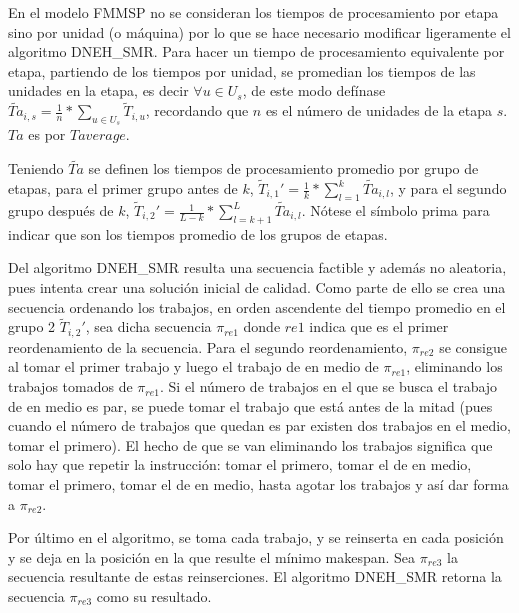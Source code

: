 \documentclass{article}
\begin{document}
\vspace{\baselineskip}
En el modelo FMMSP no
se consideran los tiempos de procesamiento por etapa sino por unidad (o máquina)
por lo que se hace necesario modificar ligeramente el algoritmo DNEH\_SMR. Para
hacer un tiempo de procesamiento equivalente por etapa, partiendo de los tiempos
por unidad, se promedian los tiempos de las unidades en la etapa, es decir
$\forall u \in U_{s}$, de este modo defínase $\widetilde{Ta}_{i,s} = \frac{1}{n}
*\sum_{u \in U_{s}} \widetilde{T}_{i,u}$, recordando que $n$ es el número de
unidades de la etapa $s$. $Ta$ es por $T average$. 

\vspace{\baselineskip}
Teniendo $\widetilde{Ta}$ se definen los tiempos de procesamiento promedio por
grupo de 
etapas, para el primer grupo antes de $k$, $\widetilde{T}_{i,1}' = \frac{1}{k}*
\sum_{l=1}^{k} \widetilde{Ta}_{i,l}$, y para el segundo grupo después de $k$,
$\widetilde{T}_{i,2}' = \frac{1}{L-k}*\sum_{l = k+1}^{L} \widetilde{Ta}_{i,l}$.
Nótese el símbolo prima para indicar que son los tiempos promedio de los grupos
de etapas. \autocite{algMNIG}

\vspace{\baselineskip}
Del algoritmo DNEH\_SMR resulta una secuencia factible y además no aleatoria,
pues intenta crear una solución inicial de calidad. Como parte de ello se crea
una secuencia ordenando los trabajos, en orden ascendente del tiempo promedio
en el grupo 2 $\widetilde{T}_{i,2}'$, sea dicha secuencia $\pi_{re1}$ donde
$re1$ indica que es el primer reordenamiento de la secuencia. Para el segundo
reordenamiento, $\pi_{re2}$ se consigue al tomar el primer trabajo y luego el
trabajo de en medio de $\pi_{re1}$, eliminando los trabajos tomados de 
$\pi_{re1}$. Si el número de trabajos en el que se busca el trabajo de en medio
es par, se puede tomar el trabajo que está antes de la mitad (pues cuando el
número de trabajos que quedan es par existen dos trabajos en el medio, tomar
el primero). El hecho de que se van eliminando los trabajos significa que solo
hay que repetir la instrucción: tomar el primero, tomar el de en medio, tomar el
primero, tomar el de en medio, hasta agotar los trabajos y así dar forma a
$\pi_{re2}$. \autocite{algMNIG}

\vspace{\baselineskip}
Por último en el algoritmo, se toma cada trabajo, y se reinserta en cada posición
y se deja en la posición
en la que resulte el mínimo makespan. Sea $\pi_{re3}$ la secuencia resultante de
estas reinserciones. El algoritmo DNEH\_SMR retorna la secuencia $\pi_{re3}$
como su resultado. \autocite{algMNIG}
\end{document}
